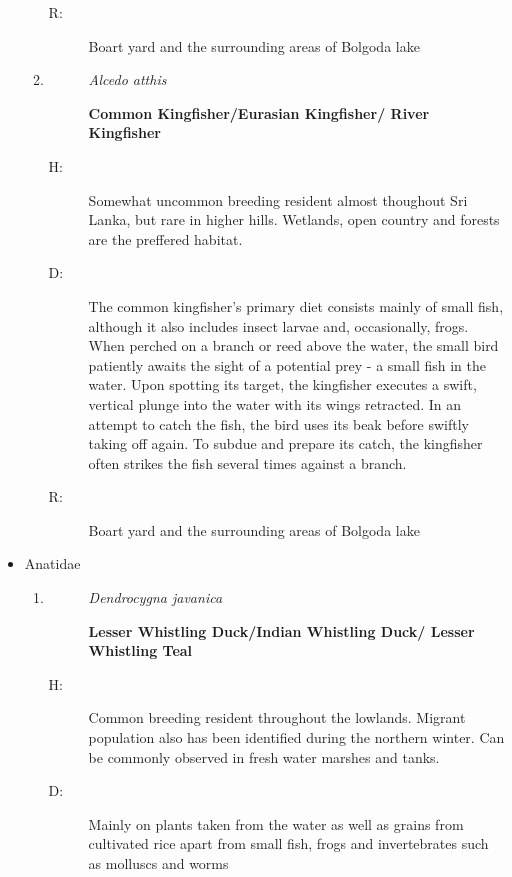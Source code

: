 \begin{itemize}
\begin{enumerate}
\begin{description}
\item[R: ]%
Boart yard and the surrounding areas of Bolgoda lake%
\end{description}%
\item%
\begin{description}%
\item[]%
\textit{Alcedo atthis}%
\item[]%
\textbf{Common Kingfisher/Eurasian Kingfisher/ River Kingfisher}%
\end{description}%
\begin{description}%
\item[H: ]%
Somewhat uncommon breeding resident almost thoughout Sri Lanka, but rare in higher hills. Wetlands, open country and forests are the preffered habitat.%
\item[D: ]%
The common kingfisher's primary diet consists mainly of small fish, although it also includes insect larvae and, occasionally, frogs. When perched on a branch or reed above the water, the small bird patiently awaits the sight of a potential prey {-} a small fish in the water. Upon spotting its target, the kingfisher executes a swift, vertical plunge into the water with its wings retracted. In an attempt to catch the fish, the bird uses its beak before swiftly taking off again. To subdue and prepare its catch, the kingfisher often strikes the fish several times against a branch.%
\item[R: ]%
Boart yard and the surrounding areas of Bolgoda lake%
\end{description}%
\end{enumerate}%
\item%
Anatidae%
\begin{enumerate}%
\item%
\begin{description}%
\item[]%
\textit{Dendrocygna javanica}%
\item[]%
\textbf{Lesser Whistling Duck/Indian Whistling Duck/ Lesser Whistling Teal}%
\end{description}%
\begin{description}%
\item[H: ]%
Common breeding resident throughout the lowlands. Migrant population also has been identified during the northern winter. Can be commonly observed in fresh water marshes and tanks.%
\item[D: ]%
Mainly on plants taken from the water as well as grains from cultivated rice apart from small fish, frogs and invertebrates such as molluscs and worms%

\end{description}
\end{enumerate}
\end{itemize}
